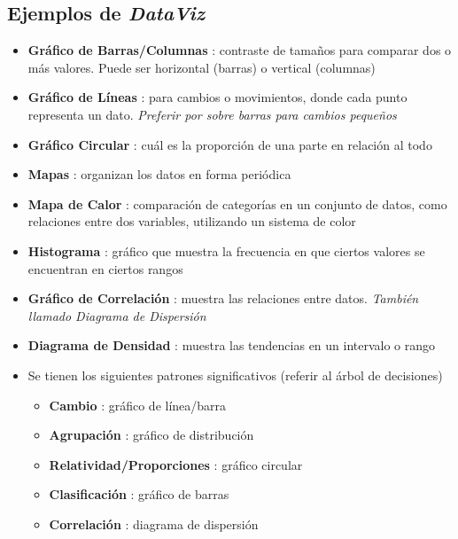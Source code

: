 \subsection{Ejemplos de \textit{DataViz}}
\begin{itemize}
    \item {\textbf{Gráfico de Barras/Columnas} : contraste de tamaños para comparar dos o más valores. Puede ser horizontal (barras) o vertical (columnas)}
    \item {\textbf{Gráfico de Líneas} : para cambios o movimientos, donde cada punto representa un dato. \textit{Preferir por sobre barras para cambios pequeños}}
    \item {\textbf{Gráfico Circular} : cuál es la proporción de una parte en relación al todo}
    \item {\textbf{Mapas} : organizan los datos en forma periódica}
    \item {\textbf{Mapa de Calor} : comparación de categorías en un conjunto de datos, como relaciones entre dos variables, utilizando un sistema de color}
    \item {\textbf{Histograma} : gráfico que muestra la frecuencia en que ciertos valores se encuentran en ciertos rangos}
    \item {\textbf{Gráfico de Correlación} : muestra las relaciones entre datos. \textit{También llamado Diagrama de Dispersión}}
    \item {\textbf{Diagrama de Densidad} : muestra las tendencias en un intervalo o rango}
    \item {Se tienen los siguientes patrones significativos (referir al árbol de decisiones)
    \begin{itemize}
        \item {\textbf{Cambio} : gráfico de línea/barra}
        \item {\textbf{Agrupación} : gráfico de distribución}
        \item {\textbf{Relatividad/Proporciones} : gráfico circular}
        \item {\textbf{Clasificación} : gráfico de barras}
        \item {\textbf{Correlación} : diagrama de dispersión}
    \end{itemize}}
\end{itemize}

